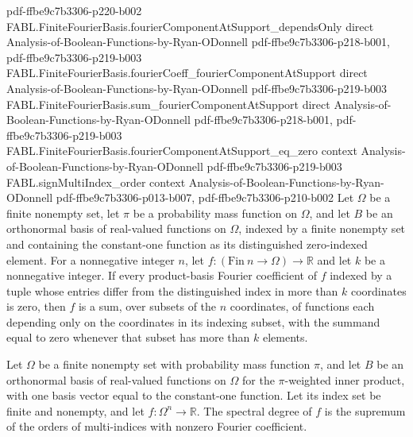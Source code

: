 \begin{theorem}
{    pdf-ffbe9c7b3306-p220-b002}
\proofstep
  {FABL.FiniteFourierBasis.fourierComponentAtSupport_dependsOnly}
  {direct}
  {Analysis-of-Boolean-Functions-by-Ryan-ODonnell}
  {pdf-ffbe9c7b3306-p218-b001,
    pdf-ffbe9c7b3306-p219-b003}
\proofstep
  {FABL.FiniteFourierBasis.fourierCoeff_fourierComponentAtSupport}
  {direct}
  {Analysis-of-Boolean-Functions-by-Ryan-ODonnell}
  {pdf-ffbe9c7b3306-p219-b003}
\proofstep
  {FABL.FiniteFourierBasis.sum_fourierComponentAtSupport}
  {direct}
  {Analysis-of-Boolean-Functions-by-Ryan-ODonnell}
  {pdf-ffbe9c7b3306-p218-b001,
    pdf-ffbe9c7b3306-p219-b003}
\proofstep
  {FABL.FiniteFourierBasis.fourierComponentAtSupport_eq_zero}
  {context}
  {Analysis-of-Boolean-Functions-by-Ryan-ODonnell}
  {pdf-ffbe9c7b3306-p219-b003}
\proofstep
  {FABL.signMultiIndex_order}
  {context}
  {Analysis-of-Boolean-Functions-by-Ryan-ODonnell}
  {pdf-ffbe9c7b3306-p013-b007,
    pdf-ffbe9c7b3306-p210-b002}
Let $\Omega$ be a finite nonempty set, let $\pi$ be a probability mass function on
$\Omega$, and let $B$ be an orthonormal basis of real-valued functions on $\Omega$,
indexed by a finite nonempty set and containing the constant-one function as its
distinguished zero-indexed element. For a nonnegative integer $n$, let $f:(\mathrm{Fin}\
n\to\Omega)\to\mathbb{R}$ and let $k$ be a nonnegative integer. If every product-basis
Fourier coefficient of $f$ indexed by a tuple whose entries differ from the
distinguished index in more than $k$ coordinates is zero, then $f$ is a sum, over
subsets of the $n$ coordinates, of functions each depending only on the coordinates in
its indexing subset, with the summand equal to zero whenever that subset has more than
$k$ elements.
\end{theorem}

\begin{definition}
\label{FABL.FiniteFourierBasis.spectralDegree}
\leanok
{}
Let $\Omega$ be a finite nonempty set with probability mass function $\pi$, and let $B$
be an orthonormal basis of real-valued functions on $\Omega$ for the $\pi$-weighted
inner product, with one basis vector equal to the constant-one function. Let its index
set be finite and nonempty, and let $f\colon\Omega^n\to\mathbb{R}$. The spectral degree
of $f$ is the supremum of the orders of multi-indices with nonzero Fourier coefficient.
\end{definition}

